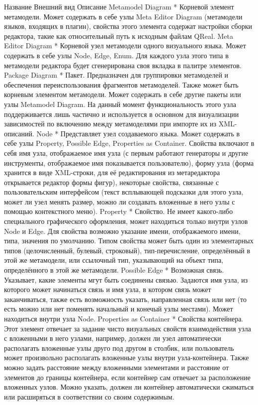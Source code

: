Название
Внешний вид
Описание
Metamodel Diagram
*
Корневой элемент метамодели. Может содержать в себе узлы Meta Editor Diagram (метамодели языков, входящих в плагин), свойства этого элемента содержат настройки сборки редактора, такие как относительный путь к исходным файлам QReal.
Meta Editor Diagram
*
Корневой узел метамодели одного визуального языка. Может содержать в себе узлы Node, Edge, Enum. Для каждого узла этого типа в метамодели редактора будет сгенерирована своя вкладка в палитре элементов.
Package Diagram
*
Пакет. Предназначен для группировки метамоделей и обеспечения переиспользования фрагментов метамоделей. Также может быть корневым элементом метамодели. Может содержать в себе другие пакеты или узлы Metamodel Diagram. На данный момент функциональность этого узла поддерживается лишь частично и используется в основном для визуализации зависимостей по включению между метамоделями при импорте их из XML-описаний.
Node
*
Представляет узел создаваемого языка. Может содержать в себе узлы Property, Possible Edge, Properties as Container. Свойства включают в себя имя узла, отображаемое имя узла (с первым работают генераторы и другие инструменты, отображаемое имя показывается пользователю), форму узла (форма хранится в виде XML-строки, для её редактирования из метаредактора открывается редактор формы фигур), некоторые свойства, связанные с пользовательским интерфейсом (текст всплывающей подсказки для этого узла, может ли узел менять размер, можно ли создавать вложенные в него узлы с помощью контекстного меню).
Property
*
Свойство. Не имеет какого-либо специального графического оформления, может находиться только внутри узлов Node и Edge. Для свойства возможно указание имени, отображаемого имени, типа, значения по умолчанию. Типом свойства может быть один из элементарных типов (целочисленный, булевый, строковый), тип-перечисление, определённый в этой же метамодели, или ссылочный тип, указывающий на объект типа, определённого в этой же метамодели.
Possible Edge
*
Возможная связь. Указывает, какие элементы мгут быть соединены связью. Задаются имя узла, из которого может начинаться связь и имя узла, в котором связь может заканчиваться, также есть возможность указать, направленная связь или нет (то есть можно или нет поменять начальный и конечый узлы местами). Может находиться внутри узла Node.
Properties as Container
*
Свойства контейнера. Этот элемент отвечает за задание чисто визуальных свойств взаимодействия узла с вложенными в него узлами, например, должен ли узел автоматически располагать вложенные узлы друго под другом в столбик, или пользователь может произвольно располагать вложенные узлы внутри узла-контейнера. Также можно задать расстояние между вложенными элементами и расстояние от элементов до границы контейнера, если контейнер сам отвечает за расположение вложенных узлов. Можно указать, должен ли контейнер автоматически сжиматься или расширяться в соответствии со своим содержимым.
